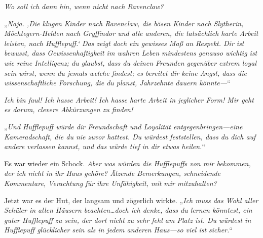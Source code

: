 \emph{Wo soll ich dann hin, wenn nicht nach Ravenclaw? }

„\emph{Naja. ‚Die klugen Kinder nach Ravenclaw, die bösen Kinder nach Slytherin, Möchtegern-Helden nach Gryffindor und alle anderen, die tatsächlich harte Arbeit leisten, nach Hufflepuff.‘ Das zeigt doch ein gewisses Maß an Respekt. Dir ist bewusst, dass Gewissenhaftigkeit im wahren Leben mindestens genauso wichtig ist wie reine Intelligenz; du glaubst, dass du deinen Freunden gegenüber extrem loyal sein wirst, wenn du jemals welche findest; es bereitet dir keine Angst, dass die wissenschaftliche Forschung, die du planst, Jahrzehnte dauern könnte—}“

\emph{Ich bin faul! Ich hasse Arbeit! Ich hasse harte Arbeit in jeglicher Form! Mir geht es darum, clevere Abkürzungen zu finden! }

„\emph{Und Hufflepuff würde dir Freundschaft und Loyalität entgegenbringen—eine Kameradschaft, die du nie zuvor hattest. Du würdest feststellen, dass du dich auf andere verlassen kannst, und das würde tief in dir etwas heilen.}“

Es war wieder ein Schock. \emph{Aber was würden die Hufflepuffs von \emph{mir} bekommen, der ich nicht in ihr Haus gehöre? Ätzende Bemerkungen, schneidende Kommentare, Verachtung für ihre Unfähigkeit, mit mir mitzuhalten?}

Jetzt war es der Hut, der langsam und zögerlich wirkte. „\emph{Ich muss das Wohl aller Schüler in allen Häusern beachten…doch ich denke, dass du lernen könntest, ein guter Hufflepuff zu sein, der dort nicht zu sehr fehl am Platz ist. Du würdest in Hufflepuff glücklicher sein als in jedem anderen Haus—so viel ist sicher.}“

